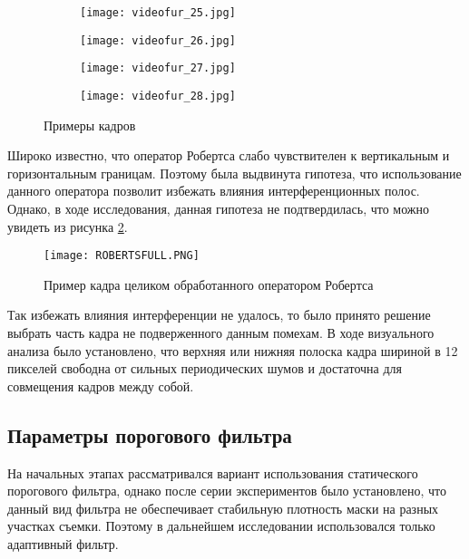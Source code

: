 \begin{figure}[h]
    \centering
    \begin{subfigure}{\textwidth}  
        \centering
        \texttt{[image: videofur\_25.jpg]}
        \smallskip 
    \end{subfigure}    
     \begin{subfigure}{\textwidth}  
        \centering
        \texttt{[image: videofur\_26.jpg]}        
        \smallskip 
    \end{subfigure}
     \begin{subfigure}{\textwidth}  
        \centering
        \texttt{[image: videofur\_27.jpg]}        
        \smallskip 
    \end{subfigure}
     \begin{subfigure}{\textwidth}  
        \centering
        \texttt{[image: videofur\_28.jpg]}
    \end{subfigure}

        \caption{Примеры кадров}
        \label{fig:semple}
\end{figure}

Широко известно, что оператор Робертса слабо чувствителен к вертикальным и горизонтальным границам. Поэтому была выдвинута гипотеза, что использование данного оператора позволит избежать влияния интерференционных полос. Однако, в ходе исследования, данная гипотеза не подтвердилась, что можно увидеть из рисунка \ref{fig:robertsComp}.
\begin{figure}
    \centering   
    \texttt{[image: ROBERTSFULL.PNG]} 
    \caption{Пример кадра целиком обработанного оператором Робертса}
    \label{fig:robertsComp}
\end{figure}
Так избежать влияния интерференции не удалось, то было принято решение выбрать часть кадра не подверженного данным помехам. В ходе визуального анализа было установлено, что верхняя или нижняя полоска кадра шириной в 12 пикселей свободна от сильных периодических шумов и достаточна для совмещения кадров между собой. 
\subsection{Параметры порогового фильтра}
На начальных этапах рассматривался вариант использования статического порогового фильтра, однако после серии экспериментов было установлено, что данный вид фильтра не обеспечивает стабильную плотность маски на разных участках съемки. Поэтому в дальнейшем исследовании использовался только адаптивный фильтр.

